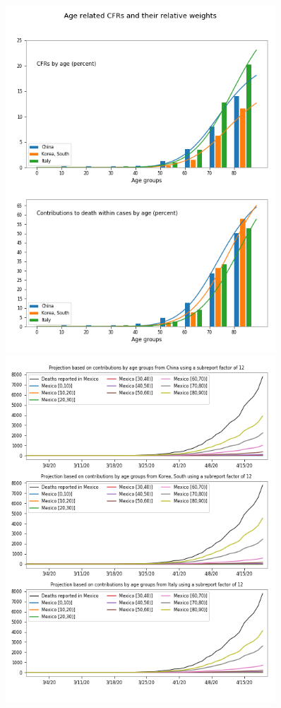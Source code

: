 \begin{figure}[h]
\centering
\begin{minipage}{0.5\textwidth}
\includegraphics[width=0.9\textwidth]{figures/tsam_Covid19_JHU_cfr+propDeathCases_ByAge_China+SKorea+Italy_OneFigure.png}
\end{minipage}%
\begin{minipage}{0.5\textwidth}
\includegraphics[width=0.9\textwidth] {figures/tsam_Covid19_JHU_cfr+propDeathCasesByAgeTS_EstimatesMexico_subReportFactor12.png}

\end{minipage}
\end{figure}
